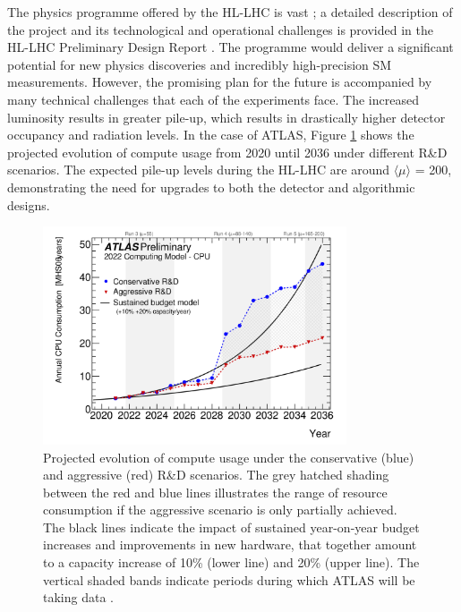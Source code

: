 The physics programme offered by the HL-LHC is vast \cite{big-report}; a detailed description of the project and its technological and operational challenges is provided in the HL-LHC Preliminary Design Report \cite{Apollinari:2116337}. The programme would deliver a significant potential for new physics discoveries and incredibly high-precision SM measurements. However, the promising plan for the future is accompanied by many technical challenges that each of the experiments face. The increased luminosity results in greater pile-up, which results in drastically higher detector occupancy and radiation levels. In the case of ATLAS, Figure \ref{fig:pileup-walltime} shows the projected evolution of compute usage from 2020 until 2036 under different R\&D scenarios. The expected pile-up levels during the HL-LHC are around $\langle \mu \rangle$ = 200, demonstrating the need for upgrades to both the detector and algorithmic designs.

\begin{figure}[!htbp]
  \centering
  \includegraphics[width=0.8\textwidth]{images/2-LHC-ATLAS/computing-model.png}
  \caption{
    Projected evolution of compute usage under the conservative (blue) and aggressive (red) R\&D scenarios. The grey hatched shading between the red and blue lines illustrates the range of resource consumption if the aggressive scenario is only partially achieved. The black lines indicate the impact of sustained year-on-year budget increases and improvements in new hardware, that together amount to a capacity increase of 10\% (lower line) and 20\% (upper line). The vertical shaded bands indicate periods during which ATLAS will be taking data \cite{Collaboration:2802918}.
  }
  \label{fig:pileup-walltime}
\end{figure}


